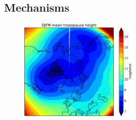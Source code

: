 \subsection{Mechanisms}
\label{sec:mechanisms}


\begin{figure}
 \centering
 \noindent\includegraphics[width=0.5\textwidth]{figures/chapter-intro/mean_tropopause_height.pdf}
 \caption[]{ }
 \label{fig:cmip5_mslp_diff}
\end{figure}










